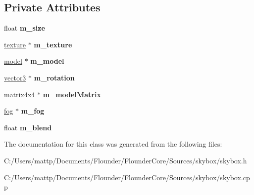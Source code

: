 \subsection*{Private Attributes}
\begin{DoxyCompactItemize}
\item 
\mbox{\label{classflounder_1_1skybox_a86732f5bf985dbade5e0267b00864146}} 
float {\bfseries m\+\_\+size}
\item 
\mbox{\label{classflounder_1_1skybox_a7f446515bdea0a6341fac3f961e9707b}} 
\hyperlink{classflounder_1_1texture}{texture} $\ast$ {\bfseries m\+\_\+texture}
\item 
\mbox{\label{classflounder_1_1skybox_a8533ad0cefb38d6868f415656aaf14b3}} 
\hyperlink{classflounder_1_1model}{model} $\ast$ {\bfseries m\+\_\+model}
\item 
\mbox{\label{classflounder_1_1skybox_a7ca62d998df7042053987dfb219500fc}} 
\hyperlink{classflounder_1_1vector3}{vector3} $\ast$ {\bfseries m\+\_\+rotation}
\item 
\mbox{\label{classflounder_1_1skybox_a149b6fde2e5d6c91cbb7dda23e018660}} 
\hyperlink{classflounder_1_1matrix4x4}{matrix4x4} $\ast$ {\bfseries m\+\_\+model\+Matrix}
\item 
\mbox{\label{classflounder_1_1skybox_a0359e93148997f9d0ae2afb83cd38faa}} 
\hyperlink{classflounder_1_1fog}{fog} $\ast$ {\bfseries m\+\_\+fog}
\item 
\mbox{\label{classflounder_1_1skybox_a09c5b61727e96dfd822d95255d23badc}} 
float {\bfseries m\+\_\+blend}
\end{DoxyCompactItemize}


The documentation for this class was generated from the following files\+:\begin{DoxyCompactItemize}
\item 
C\+:/\+Users/mattp/\+Documents/\+Flounder/\+Flounder\+Core/\+Sources/skybox/skybox.\+h\item 
C\+:/\+Users/mattp/\+Documents/\+Flounder/\+Flounder\+Core/\+Sources/skybox/skybox.\+cpp\end{DoxyCompactItemize}
